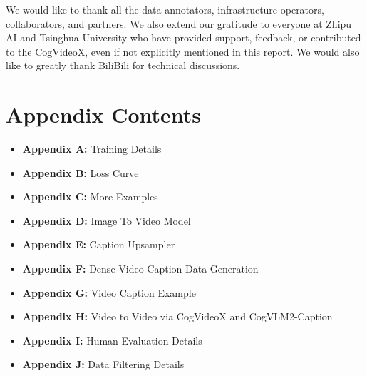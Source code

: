 \documentclass{article}
\newcommand{\model}{CogVideoX\xspace}
\begin{document}
We would like to thank all the data annotators, infrastructure operators, collaborators, and partners. We also extend our gratitude to everyone at Zhipu AI and Tsinghua University who have provided support, feedback, or contributed to the \model, even if not explicitly mentioned in this report.
We would also like to greatly thank BiliBili for technical discussions. 







\clearpage



\appendix

\section*{Appendix Contents}  %
\begin{itemize}
    \item \textbf{Appendix A:} Training Details
    \item \textbf{Appendix B:} Loss Curve
    \item \textbf{Appendix C:} More Examples
    \item \textbf{Appendix D:} Image To Video Model
    \item \textbf{Appendix E:} Caption Upsampler
    \item \textbf{Appendix F:} Dense Video Caption Data Generation
    \item \textbf{Appendix G:} Video Caption Example
    \item \textbf{Appendix H:} Video to Video via CogVideoX and CogVLM2-Caption
    \item \textbf{Appendix I:} Human Evaluation Details
    \item \textbf{Appendix J:} Data Filtering Details
    
\end{itemize}











\end{document}
